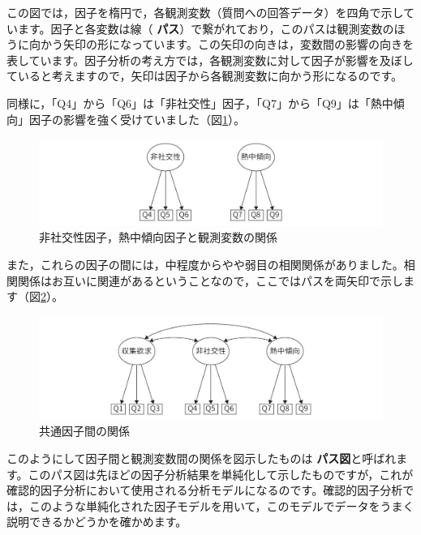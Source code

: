 \documentclass[
  12pt,
  a5jpaper,
  lualatex, ja=standard]{bxjsbook}
\renewcommand{\emph}[1]{\textbf{\color{emph} #1}}
\begin{document}
この図では，因子を楕円で，各観測変数（質問への回答データ）を四角で示しています。因子と各変数は線（\emph{パス}）で繋がれており，このパスは観測変数のほうに向かう矢印の形になっています。この矢印の向きは，変数間の影響の向きを表しています。因子分析の考え方では，各観測変数に対して因子が影響を及ぼしていると考えますので，矢印は因子から各観測変数に向かう形になるのです。

同様に，「Q4」から「Q6」は「非社交性」因子，「Q7」から「Q9」は「熱中傾向」因子の影響を強く受けていました（図\ref{fig:factor-cfa-model2}）。

\begin{figure}[!ht]

{\centering \includegraphics[width=1\linewidth]{images/factor/cfa-model2} 

}

\caption{非社交性因子，熱中傾向因子と観測変数の関係}\label{fig:factor-cfa-model2}
\end{figure}

また，これらの因子の間には，中程度からやや弱目の相関関係がありました。相関関係はお互いに関連があるということなので，ここではパスを両矢印で示します（図\ref{fig:factor-cfa-model3}）。

\begin{figure}[!ht]

{\centering \includegraphics[width=1\linewidth]{images/factor/cfa-model3} 

}

\caption{共通因子間の関係}\label{fig:factor-cfa-model3}
\end{figure}

このようにして因子間と観測変数間の関係を図示したものは\emph{パス図}と呼ばれます。このパス図は先ほどの因子分析結果を単純化して示したものですが，これが確認的因子分析において使用される分析モデルになるのです。確認的因子分析では，このような単純化された因子モデルを用いて，このモデルでデータをうまく説明できるかどうかを確かめます。
\end{document}
